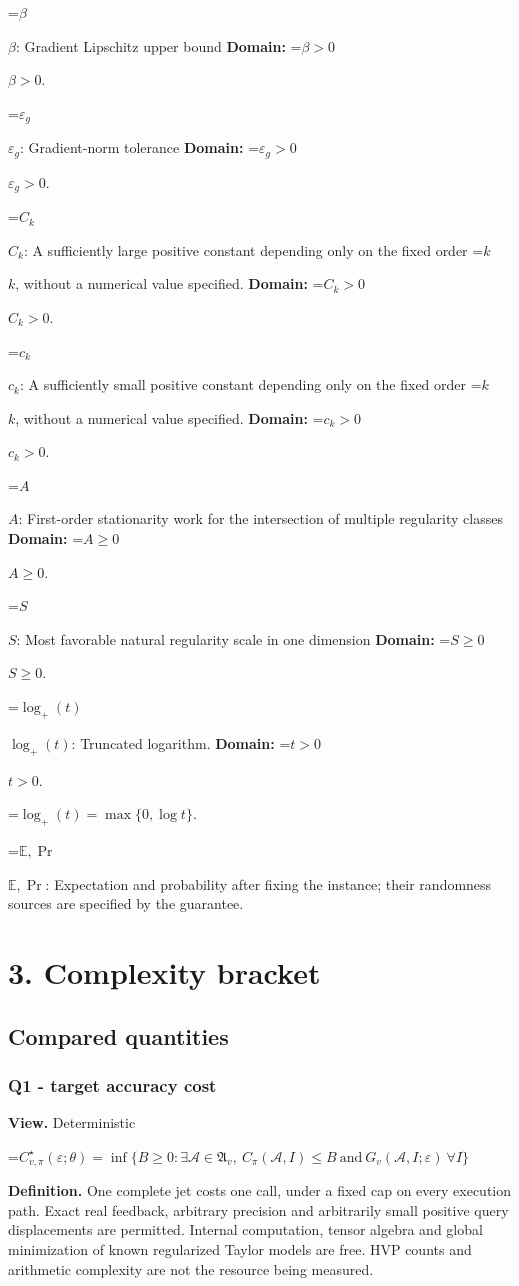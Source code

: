 \documentclass[10pt,a4paper]{article}
\newcommand{\AtlasMath}[1]{\par\begingroup\centering\setbox0=\hbox{$\displaystyle #1$}\ifdim\wd0>1.4\linewidth\typeout{ATLAS WIDE FORMULA: \the\wd0}\fi\ifdim\wd0>\linewidth\resizebox{\linewidth}{!}{\box0}\else\box0\fi\par\endgroup}
\newcommand{\AtlasInlineMath}[1]{\begingroup\setbox0=\hbox{$#1$}\ifdim\wd0>.4\linewidth\endgroup\AtlasMath{#1}\else\endgroup$#1$\fi}
\begin{document}
\AtlasInlineMath{\beta}: Gradient Lipschitz upper bound \textbf{Domain:} \AtlasInlineMath{\beta>0}.

\AtlasInlineMath{\varepsilon_g}: Gradient-norm tolerance \textbf{Domain:} \AtlasInlineMath{\varepsilon_g>0}.

\AtlasInlineMath{C_k}: A sufficiently large positive constant depending only on the fixed order \AtlasInlineMath{k}, without a numerical value specified. \textbf{Domain:} \AtlasInlineMath{C_k>0}.

\AtlasInlineMath{c_k}: A sufficiently small positive constant depending only on the fixed order \AtlasInlineMath{k}, without a numerical value specified. \textbf{Domain:} \AtlasInlineMath{c_k>0}.

\AtlasInlineMath{A}: First-order stationarity work for the intersection of multiple regularity classes \textbf{Domain:} \AtlasInlineMath{A\ge0}.

\AtlasInlineMath{S}: Most favorable natural regularity scale in one dimension \textbf{Domain:} \AtlasInlineMath{S\ge0}.

\AtlasInlineMath{\log_+(t)}: Truncated logarithm. \textbf{Domain:} \AtlasInlineMath{t>0}.


\AtlasMath{\log_+(t)=\max\{0,\log t\}.}


\AtlasInlineMath{\mathbb{E},\Pr}: Expectation and probability after fixing the instance; their randomness sources are specified by the guarantee.

\section{3. Complexity bracket}
\subsection{Compared quantities}
\subsubsection{Q1 - target accuracy cost}
\textbf{View.} Deterministic

\AtlasMath{C^\star_{v,\pi}(\varepsilon;\theta)=\inf\{B\ge0:\exists\mathcal A\in\mathfrak A_v,\ C_\pi(\mathcal A,I)\le B\ \text{and}\ G_v(\mathcal A,I;\varepsilon)\ \forall I\}}
\textbf{Definition.} One complete jet costs one call, under a fixed cap on every execution path. Exact real feedback, arbitrary precision and arbitrarily small positive query displacements are permitted. Internal computation, tensor algebra and global minimization of known regularized Taylor models are free. HVP counts and arithmetic complexity are not the resource being measured.
\end{document}
